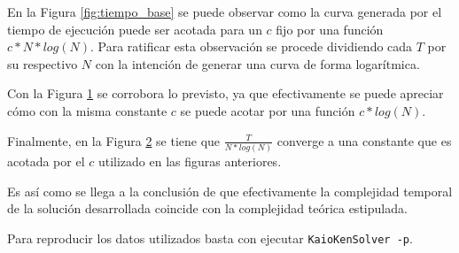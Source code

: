 	En la Figura \ref{fig:tiempo_base} se puede observar como la curva generada por el
	tiempo de ejecución puede ser acotada para un $c$ fijo por una función
	$c*N*log(N)$. Para ratificar esta observación se procede dividiendo cada $T$
	por su respectivo $N$ con la intención de generar una curva de forma
	logarítmica.

	\begin{figure}[H]
		\centering
		\caption{}
		\label{fig:tiempo_sobre_n}
	\end{figure}

	Con la Figura \ref{fig:tiempo_sobre_n} se corrobora lo previsto, ya que
	efectivamente se puede apreciar cómo con la misma constante $c$ se puede
	acotar por una función $c*log(N)$.

	\begin{figure}[H]
		\centering
		\caption{}
		\label{fig:tiempo_sobre_n_log_n}
	\end{figure}

	Finalmente, en la Figura \ref{fig:tiempo_sobre_n_log_n} se tiene que
	$\frac{T}{N*log(N)}$ converge a una constante que es acotada por el $c$
	utilizado en las figuras anteriores.

	Es así como se llega a la conclusión de que efectivamente la complejidad
	temporal de la solución desarrollada coincide con la complejidad teórica estipulada.

	Para reproducir los datos utilizados basta con ejecutar \texttt{KaioKenSolver
	-p}.
